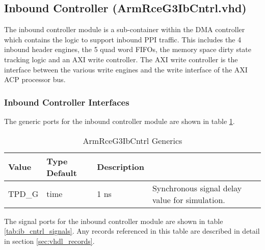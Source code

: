 \documentclass[11pt]{article}
\begin{document}
\subsection{Inbound Controller (ArmRceG3IbCntrl.vhd)}
\label{subsec:ArmRceG3IbCntrl}

The inbound controller module is a sub-container within the DMA controller which contains the logic to support inbound PPI traffic. 
This includes the 4 inbound header engines, the 5 quad word FIFOs, the memory space dirty state tracking logic and an AXI write controller.
The AXI write controller is the interface between the various write engines and the write interface of the AXI ACP processor bus. 

\subsubsection{Inbound Controller Interfaces}

The generic ports for the inbound controller module are shown in table \ref{tab:ib_cntrl_generics}.

\begin{table}[H]
\small
\centering
   \begin{tabular}{| l | l | l | l | }
      \hline \textbf{Value} & \textbf{Type} \textbf{Default} & \textbf{Description} \\
      \hline TPD\_G          & time     & 1 ns & Synchronous signal delay value for simulation.   \\
      \hline
   \end{tabular}
   \caption{ArmRceG3IbCntrl Generics}
   \label{tab:ib_cntrl_generics}
\end{table}

The signal ports for the inbound controller module are shown in table \ref{tab:ib_cntrl_signals}.
Any records referenced in this table are described in detail in section \ref{sec:vhdl_records}. 
\end{document}
